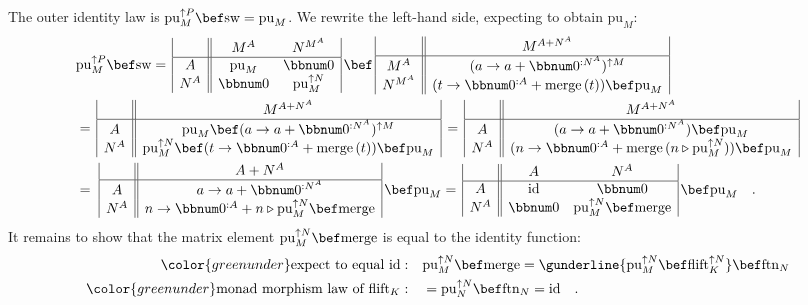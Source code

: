 The outer identity law is $\text{pu}_{M}^{\uparrow P}\bef\text{sw}=\text{pu}_{M}$.
We rewrite the left-hand side, expecting to obtain $\text{pu}_{M}$:
\begin{align*}
 & \text{pu}_{M}^{\uparrow P}\bef\text{sw}=\,\begin{array}{|c||cc|}
 & M^{A} & N^{M^{A}}\\
\hline A & \text{pu}_{M} & \bbnum 0\\
N^{A} & \bbnum 0 & \text{pu}_{M}^{\uparrow N}
\end{array}\,\bef\,\begin{array}{|c||c|}
 & M^{A+N^{A}}\\
\hline M^{A} & (a\rightarrow a+\bbnum 0^{:N^{A}})^{\uparrow M}\\
N^{M^{A}} & (t\rightarrow\bbnum 0^{:A}+\text{merge}\,(t))\bef\text{pu}_{M}
\end{array}\\
 & =\,\begin{array}{|c||c|}
 & M^{A+N^{A}}\\
\hline A & \text{pu}_{M}\bef(a\rightarrow a+\bbnum 0^{:N^{A}})^{\uparrow M}\\
N^{A} & \text{pu}_{M}^{\uparrow N}\bef(t\rightarrow\bbnum 0^{:A}+\text{merge}\,(t))\bef\text{pu}_{M}
\end{array}\,=\,\begin{array}{|c||c|}
 & M^{A+N^{A}}\\
\hline A & (a\rightarrow a+\bbnum 0^{:N^{A}})\bef\text{pu}_{M}\\
N^{A} & (n\rightarrow\bbnum 0^{:A}+\text{merge}\,(n\triangleright\text{pu}_{M}^{\uparrow N}))\bef\text{pu}_{M}
\end{array}\\
 & =\,\,\begin{array}{|c||c|}
 & A+N^{A}\\
\hline A & a\rightarrow a+\bbnum 0^{:N^{A}}\\
N^{A} & n\rightarrow\bbnum 0^{:A}+n\triangleright\text{pu}_{M}^{\uparrow N}\bef\text{merge}
\end{array}\,\bef\text{pu}_{M}=\,\begin{array}{|c||cc|}
 & A & N^{A}\\
\hline A & \text{id} & \bbnum 0\\
N^{A} & \bbnum 0 & \text{pu}_{M}^{\uparrow N}\bef\text{merge}
\end{array}\,\bef\text{pu}_{M}\quad.
\end{align*}
It remains to show that the matrix element $\text{pu}_{M}^{\uparrow N}\bef\text{merge}$
is equal to the identity function:
\begin{align*}
{\color{greenunder}\text{expect to equal }\text{id}:}\quad & \text{pu}_{M}^{\uparrow N}\bef\text{merge}=\gunderline{\text{pu}_{M}^{\uparrow N}\bef\text{flift}_{K}^{\uparrow N}}\bef\text{ftn}_{N}\\
{\color{greenunder}\text{monad morphism law of }\text{flift}_{K}:}\quad & =\text{pu}_{N}^{\uparrow N}\bef\text{ftn}_{N}=\text{id}\quad.
\end{align*}

